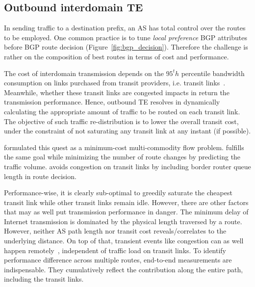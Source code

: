 \subsection{Outbound interdomain TE}
In sending traffic to a destination prefix, an AS has total control over the routes to be employed. One common practice is to tune \textit{local preference} BGP attributes~\cite{Wang2008} before BGP route decision (Figure~\ref{fig:bgp_decision}). 
Therefore the challenge is rather on the composition of best routes in terms of cost and performance.

The cost of interdomain transmission depends on the $95^th$ percentile bandwidth consumption on links purchased from transit providers, i.e. transit links~\cite{drpeering-95th}.
Meanwhile, whether these transit links are congested impacts in return the transmission performance.
Hence, outbound TE resolves in dynamically calculating the appropriate amount of traffic to be routed on each transit link.
The objective of such traffic re-distribution is to lower the overall transit cost, under the constraint of not saturating any transit link at any instant (if possible).

\citet{Goldenberg2004} formulated this quest as a minimum-cost multi-commodity flow problem.
\citet{Uhlig2004b} fulfills the same goal while minimizing the number of route changes by predicting the traffic volume.
\citet{Zhu2014} avoids congestion on transit links by including border router queue length in route decision.

Performance-wise, it is clearly sub-optimal to greedily saturate the cheapest transit link while other transit links remain idle.
However, there are other factors that may as well put transmission performance in danger.
The minimum delay of Internet transmission is dominated by the physical length traversed by a route. 
However, neither AS path length nor transit cost reveals/correlates to the underlying distance.
On top of that, transient events like congestion can as well happen remotely~\cite{Akella2003, Luckie2014}, independent of traffic load on transit links.
To identify performance difference across multiple routes, end-to-end measurements are indispensable.
They cumulatively reflect the contribution along the entire path, including the transit links.


